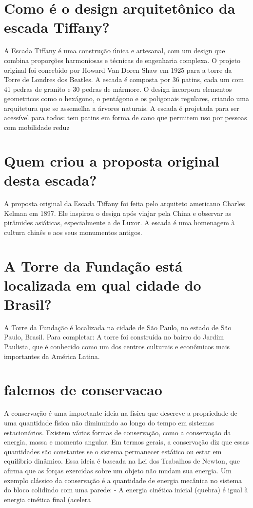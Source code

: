 \documentclass[11pt,a4paper]{article}
\begin{document}
\section{Como é o design arquitetônico da escada Tiffany?}
A Escada Tiffany é uma construção única e artesanal, com um design que combina proporções harmoniosas e técnicas de engenharia complexa. O projeto original foi concebido por Howard Van Doren Shaw em 1925 para a torre da Torre de Londres dos Beatles. A escada é composta por 36 patins, cada um com 41 pedras de granito e 30 pedras de mármore. O design incorpora elementos geometricos como o hexágono, o pentágono e os poligonais regulares, criando uma arquitetura que se assemelha a árvores naturais. A escada é projetada para ser acessível para todos: tem patins em forma de cano que permitem uso por pessoas com mobilidade reduz

\section{Quem criou a proposta original desta escada?}
A proposta original da Escada Tiffany foi feita pelo arquiteto americano Charles Kelman em 1897. Ele inspirou o design após viajar pela China e observar as pirâmides asiáticas, especialmente a de Luxor. A escada é uma homenagem à cultura chinês e aos seus monumentos antigos.

\section{A Torre da Fundação está localizada em qual cidade do Brasil?}
A Torre da Fundação é localizada na cidade de São Paulo, no estado de São Paulo, Brasil. Para completar: A torre foi construída no bairro do Jardim Paulista, que é conhecido como um dos centros culturais e econômicos mais importantes da América Latina.

\section{falemos de conservacao}
A conservação é uma importante ideia na física que descreve a propriedade de uma quantidade física não diminuindo ao longo do tempo em sistemas estacionários. Existem várias formas de conservação, como a conservação da energia, massa e momento angular. Em termos gerais, a conservação diz que essas quantidades são constantes se o sistema permanecer estático ou estar em equilíbrio dinâmico. Essa ideia é baseada na Lei dos Trabalhos de Newton, que afirma que as forças exercidas sobre um objeto não mudam sua energia. Um exemplo clássico da conservação é a quantidade de energia mecânica no sistema do bloco colidindo com uma parede: - A energia cinética inicial (quebra) é igual à energia cinética final (acelera
\end{document}
